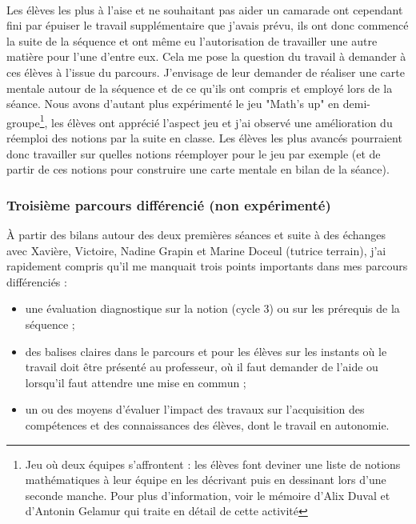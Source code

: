 \paragraph{}Les élèves les plus à l'aise et ne souhaitant pas aider un camarade ont cependant fini par épuiser le travail supplémentaire que j'avais prévu, ils ont donc commencé la suite de la séquence et ont même eu l'autorisation de travailler une autre matière pour l'une d'entre eux. Cela me pose la question du travail à demander à ces élèves à l'issue du parcours. J'envisage de leur demander de réaliser une carte mentale autour de la séquence et de ce qu'ils ont compris et employé lors de la séance. Nous avons d'autant plus expérimenté le jeu "Math's up" en demi-groupe\footnote{Jeu où deux équipes s'affrontent : les élèves font deviner une liste de notions mathématiques à leur équipe en les décrivant puis en dessinant lors d'une seconde manche. Pour plus d'information, voir le mémoire d'Alix Duval et d'Antonin Gelamur qui traite en détail de cette activité\cite{maths_up}}, les élèves ont apprécié l'aspect jeu et j'ai observé une amélioration du réemploi des notions par la suite en classe. Les élèves les plus avancés pourraient donc travailler sur quelles notions réemployer pour le jeu par exemple (et de partir de ces notions pour construire une carte mentale en bilan de la séance).

\subsubsection{Troisième parcours différencié (non expérimenté)}
À partir des bilans autour des deux premières séances et suite à des échanges avec Xavière, Victoire, Nadine Grapin et Marine Doceul (tutrice terrain), j'ai rapidement compris qu'il me manquait trois points importants dans mes parcours différenciés :
\begin{itemize}
	\item une évaluation diagnostique sur la notion (cycle 3) ou sur les prérequis de la séquence ;
	\item des balises claires dans le parcours et pour les élèves sur les instants où le travail doit être présenté au professeur, où il faut demander de l'aide ou lorsqu'il faut attendre une mise en commun ;
	\item un ou des moyens d'évaluer l'impact des travaux sur l'acquisition des compétences et des connaissances des élèves, dont le travail en autonomie.
\end{itemize}
